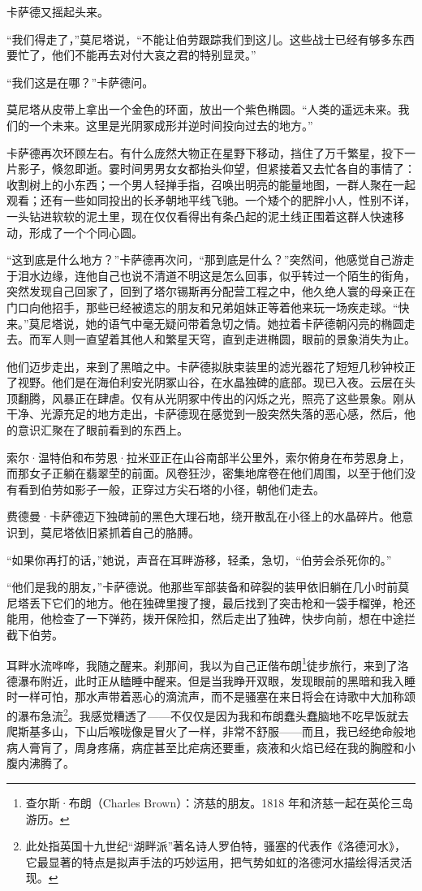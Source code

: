\documentclass[AutoFakeBold=true]{book}
\begin{document}
卡萨德又摇起头来。

``我们得走了，''莫尼塔说，``不能让伯劳跟踪我们到这儿。这些战士已经有够多东西要忙了，他们不能再去对付大哀之君的特别显灵。''

``我们这是在哪？''卡萨德问。

莫尼塔从皮带上拿出一个金色的环面，放出一个紫色椭圆。``人类的遥远未来。我们的一个未来。这里是光阴冢成形并逆时间投向过去的地方。''

卡萨德再次环顾左右。有什么庞然大物正在星野下移动，挡住了万千繁星，投下一片影子，倏忽即逝。霎时间男男女女都抬头仰望，但紧接着又去忙各自的事情了：收割树上的小东西；一个男人轻掸手指，召唤出明亮的能量地图，一群人聚在一起观看；还有一些如同投出的长矛朝地平线飞驰。一个矮个的肥胖小人，性别不详，一头钻进软软的泥土里，现在仅仅看得出有条凸起的泥土线正围着这群人快速移动，形成了一个个同心圆。

``这到底是什么地方？''卡萨德再次问，``那到底是什么？''突然间，他感觉自己游走于泪水边缘，连他自己也说不清道不明这是怎么回事，似乎转过一个陌生的街角，突然发现自己回家了，回到了塔尔锡斯再分配营工程之中，他久绝人寰的母亲正在门口向他招手，那些已经被遗忘的朋友和兄弟姐妹正等着他来玩一场疾走球。``快来。''莫尼塔说，她的语气中毫无疑问带着急切之情。她拉着卡萨德朝闪亮的椭圆走去。而军人则一直望着其他人和繁星天穹，直到走进椭圆，眼前的景象消失为止。

他们迈步走出，来到了黑暗之中。卡萨德拟肤束装里的滤光器花了短短几秒钟校正了视野。他们是在海伯利安光阴冢山谷，在水晶独碑的底部。现已入夜。云层在头顶翻腾，风暴正在肆虐。仅有从光阴冢中传出的闪烁之光，照亮了这些景象。刚从干净、光源充足的地方走出，卡萨德现在感觉到一股突然失落的恶心感，然后，他的意识汇聚在了眼前看到的东西上。

索尔·温特伯和布劳恩·拉米亚正在山谷南部半公里外，索尔俯身在布劳恩身上，而那女子正躺在翡翠茔的前面。风卷狂沙，密集地席卷在他们周围，以至于他们没有看到伯劳如影子一般，正穿过方尖石塔的小径，朝他们走去。

费德曼·卡萨德迈下独碑前的黑色大理石地，绕开散乱在小径上的水晶碎片。他意识到，莫尼塔依旧紧抓着自己的胳膊。

``如果你再打的话，''她说，声音在耳畔游移，轻柔，急切，``伯劳会杀死你的。''

``他们是我的朋友，''卡萨德说。他那些军部装备和碎裂的装甲依旧躺在几小时前莫尼塔丢下它们的地方。他在独碑里搜了搜，最后找到了突击枪和一袋手榴弹，枪还能用，他检查了一下弹药，拨开保险扣，然后走出了独碑，快步向前，想在中途拦截下伯劳。

\vspace*{1em}

耳畔水流哗哗，我随之醒来。刹那间，我以为自己正偕布朗\footnote{查尔斯·布朗（Charles Brown）：济慈的朋友。1818 年和济慈一起在英伦三岛游历。}徒步旅行，来到了洛德瀑布附近，此时正从瞌睡中醒来。但是当我睁开双眼，发现眼前的黑暗和我入睡时一样可怕，那水声带着恶心的滴流声，而不是骚塞在来日将会在诗歌中大加称颂的瀑布急流\footnote{此处指英国十九世纪``湖畔派''著名诗人罗伯特，骚塞的代表作《洛德河水》，它最显著的特点是拟声手法的巧妙运用，把气势如虹的洛德河水描绘得活灵活现。}。我感觉糟透了——不仅仅是因为我和布朗蠢头蠢脑地不吃早饭就去爬斯基多山，下山后喉咙像是冒火了一样，非常不舒服——而且，我已经绝命般地病人膏肓了，周身疼痛，病症甚至比疟病还要重，痰液和火焰已经在我的胸膛和小腹内沸腾了。
\end{document}
